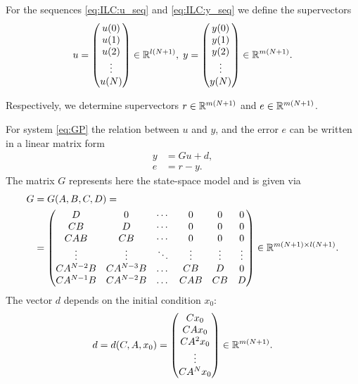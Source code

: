 For the sequences \eqref{eq:ILC:u_seq} and \eqref{eq:ILC:y_seq} we define the supervectors
\begin{align}
\label{eq:inoutsuper}
u = \begin{pmatrix}
u(0) \\ u(1) \\ u(2) \\ \vdots \\ u(N)
\end{pmatrix} \in {\mathbb{R}}^{l(N+1)}, \;
y = \begin{pmatrix}
y(0) \\ y(1) \\ y(2) \\ \vdots \\ y(N)
\end{pmatrix} \in {\mathbb{R}}^{m(N+1)}.
\end{align}

Respectively, we determine supervectors $r\in {\mathbb{R}}^{m(N+1)}$ and $e\in {\mathbb{R}}^{m(N+1)}$. 

For system \eqref{eq:GP} the relation between $u$ and $y$, and the error $e$ can be written in a linear matrix form 
\begin{align}
\label{eq:Gu + d}
y &= Gu + d, \\
e &= r - y.
\end{align}
The matrix $G$ represents here the state-space model and is given via  
\begin{align}
\label{eq:Gmatrix}
\begin{split}
G &= G(A,B,C,D) = \\
&=  \begin{pmatrix}
D & 0 & \cdots & 0 & 0 & 0 \\
CB & D & \cdots & 0 & 0 & 0\\
CAB & CB & \cdots & 0 & 0 & 0\\
\vdots & \vdots & \ddots & \vdots  & \vdots & \vdots \\
CA^{N-2} B & CA^{N-3} B &\dots &CB & D& 0\\
CA^{N-1} B & CA^{N-2} B &\dots &CAB & CB& D\\
\end{pmatrix} \in {\mathbb{R}}^{m(N+1)\times l(N+1)}.
\end{split}
\end{align}
The vector $d$ depends on the initial condition $x_0$:
\begin{align}
d = d(C,A,x_0) = \begin{pmatrix}
C x_0 \\ CA x_0 \\ CA^2 x_0 \\ \vdots \\ CA^Nx_0
\end{pmatrix} \in {\mathbb{R}}^{m(N+1)}.
\end{align}



